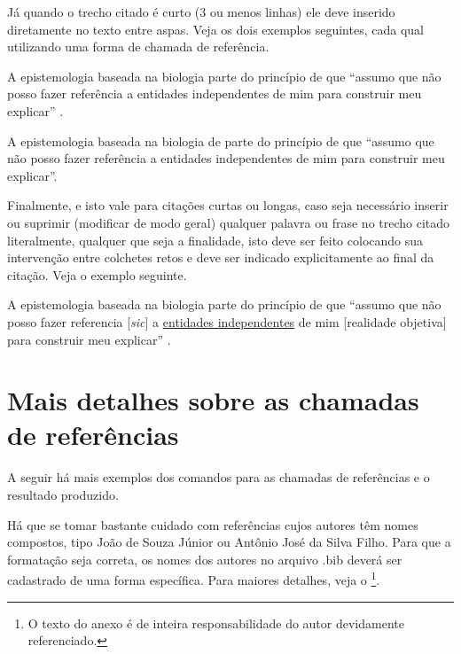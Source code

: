 \begin{apendicesenv}
Já quando o trecho citado é curto (3 ou menos linhas) ele deve inserido diretamente no texto entre aspas. Veja os dois exemplos seguintes, cada qual utilizando uma forma de chamada de referência.

A epistemologia baseada na biologia parte do princípio de que ``assumo que não posso fazer referência a entidades independentes de mim para construir meu explicar'' \cite[p.~35]{Maturana2003}.

A epistemologia baseada na biologia de  parte do princípio de que ``assumo que não posso fazer referência a entidades independentes de mim para construir meu explicar''.

Finalmente, e isto vale para citações curtas ou longas, caso seja necessário inserir ou suprimir (modificar de modo geral) qualquer palavra ou frase no trecho citado literalmente, qualquer que seja a finalidade, isto deve ser feito colocando sua intervenção entre colchetes retos e deve ser indicado explicitamente ao final da citação. Veja o exemplo seguinte.

A epistemologia baseada na biologia parte do princípio de que ``assumo que não posso fazer referencia [\textit{sic}] a \underline{entidades independentes} de mim [realidade objetiva] para construir meu explicar'' \cite[p.~35, comentários e grifo nosso]{Maturana2003}.

\section{Mais detalhes sobre as chamadas de referências}
\label{sec:chamadas_referencias}

A seguir há mais exemplos dos comandos para as chamadas de referências e o resultado produzido.


Há que se tomar bastante cuidado com referências cujos autores têm nomes compostos, tipo João de Souza Júnior ou Antônio José da Silva Filho. Para que a formatação seja correta, os nomes dos autores no arquivo {\ttfamily .bib} deverá ser cadastrado de uma forma específica. Para maiores detalhes, veja o  \footnote{O texto do anexo é de inteira responsabilidade do autor devidamente referenciado.}.


\end{apendicesenv}

